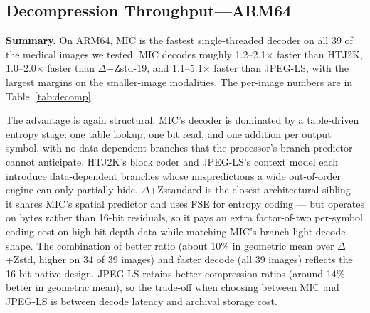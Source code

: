 \documentclass[journal]{IEEEtran}
\begin{document}
\subsection{Decompression Throughput---ARM64}
\label{subsec:decomp-arm}

\textbf{Summary.} On ARM64, MIC is the fastest single-threaded decoder
on all 39 of the medical images we tested. MIC decodes roughly
1.2--2.1$\times$ faster than HTJ2K, 1.0--2.0$\times$ faster than
$\Delta$+Zstd-19, and 1.1--5.1$\times$ faster than JPEG-LS, with the
largest margins on the smaller-image modalities. The per-image numbers
are in Table~\ref{tab:decomp}.

The advantage is again structural. MIC's decoder is dominated by a
table-driven entropy stage: one table lookup, one bit read, and one
addition per output symbol, with no data-dependent branches that the
processor's branch predictor cannot anticipate. HTJ2K's block coder and
JPEG-LS's context model each introduce data-dependent branches whose
mispredictions a wide out-of-order engine can only partially hide. $\Delta$+Zstandard is the closest architectural sibling --- it
shares MIC's spatial predictor and uses FSE for entropy coding --- but
operates on bytes rather than 16-bit residuals, so it pays an extra
factor-of-two per-symbol coding cost on high-bit-depth data while
matching MIC's branch-light decode shape. The combination of better
ratio (about 10\% in geometric mean over $\Delta$+Zstd, higher on 34 of
39 images) and faster decode (all 39 images) reflects the 16-bit-native
design. JPEG-LS retains better compression ratios (around 14\% better in
geometric mean), so the trade-off when choosing between MIC and
JPEG-LS is between decode latency and archival storage cost.
\end{document}
